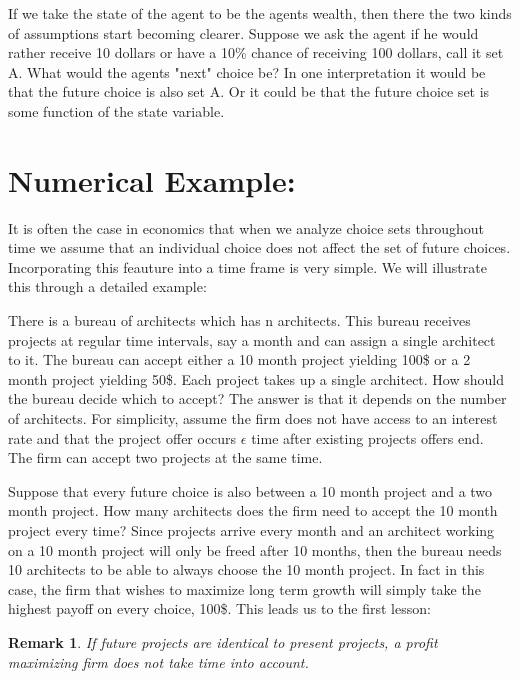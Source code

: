 \documentclass[12pt]{report}
\newtheorem{remark}{Remark}
\numberwithin{equation}{section}
\begin{document}
If we take the state of the agent to be the agents wealth, then there the two kinds of assumptions start becoming clearer. Suppose we ask the agent if he would rather receive 10 dollars or have a 10\% chance of receiving 100 dollars, call it set A. What would the agents "next" choice be? In one interpretation it would be that the future choice is also set A. Or it could be that the future choice set is some function of the state variable. 





\section{Numerical Example:}

It is often the case in economics that when we analyze choice sets throughout time we assume that an individual choice does not affect the set of future choices. Incorporating this feauture into a time frame is very simple. We will illustrate this through a detailed example: 

There is a bureau of architects which has n architects. This bureau receives projects at regular time intervals, say a month and can assign a single architect to it. The bureau can accept either a 10 month project yielding 100\$ or a 2 month project yielding 50\$. Each project takes up a single architect. How should the bureau decide which to accept? The answer is that it depends on the number of architects. For simplicity, assume the firm does not have access to an interest rate and that the project offer occurs $\epsilon$ time after existing projects offers end. The firm can accept two projects at the same time. 

Suppose that every future choice is also between a 10 month project and a two month project. How many architects does the firm need to accept the 10 month project every time? Since projects arrive every month and an architect working on a 10 month project will only be freed after 10 months, then the bureau needs 10 architects to be able to always choose the 10 month project. In fact in this case, the firm that wishes to maximize long term growth will simply take the highest payoff on every choice, 100\$. This leads us to the first lesson:

\begin{remark}
If future projects are identical to present projects, a profit maximizing firm does not take time into account. 
\end{remark}
\end{document}
